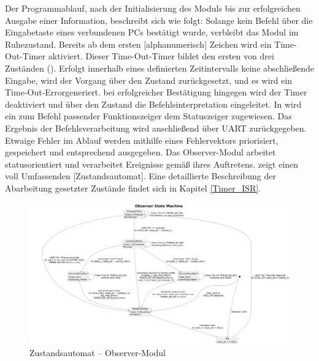 Der Programmablauf, nach der Initialisierung des Moduls bis zur erfolgreichen Ausgabe einer Information, beschreibt sich wie folgt:
Solange kein Befehl \"uber die Eingabetaste eines verbundenen PCs best\"atigt wurde, verbleibt das Modul im Ruhezustand. Bereits ab dem ersten [alphanumerisch] Zeichen wird ein \glqq Time-Out\grqq-Timer aktiviert. Dieser Time-Out-Timer bildet den ersten von drei Zust\"anden (). Erfolgt innerhalb eines definierten Zeitintervalls keine abschlie{\ss}ende Eingabe, wird der Vorgang \"uber den Zustand  zur\"uckgesetzt, und es wird ein \glqq Time-Out-Error\grqq generiert. bei erfolgreicher Best\"atigung hingegen wird der Timer deaktiviert und \"uber den Zustand  die Befehlsinterpretation eingeleitet. In  wird ein zum Befehl passender Funktionszeiger dem Statuszeiger zugewiesen. Das Ergebnis der Befehlsverarbeitung wird anschlie{\ss}end \"uber UART zur\"uckgegeben. Etwaige Fehler im Ablauf werden mithilfe eines Fehlervektors priorisiert, gespeichert und entsprechend ausgegeben. Das Observer-Modul arbeitet statusorientiert und verarbeitet Ereignisse gem\"a{\ss} ihres Auftretens.  zeigt einen voll Umfassenden [Zustandsautomat].
Eine detaillierte Beschreibung der Abarbeitung gesetzter Zust\"ande findet sich in Kapitel \ref{Timer_ISR}.

\begin{figure}[h!]
	\centering
	\includegraphics[width=1.0\textwidth]{../Bilder/observer_state_machine.png}
	\caption{Zustandsautomat -- Observer-Modul}
	\label{fig:StateMachine_ObserverModul}
\end{figure}

